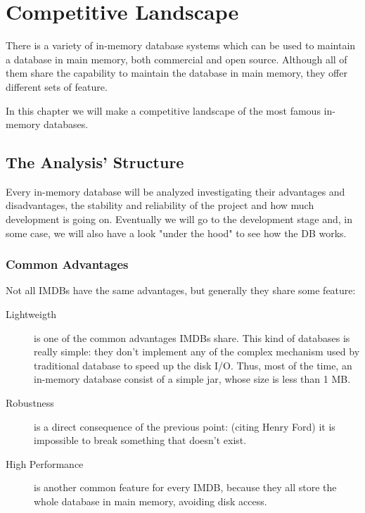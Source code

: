 \chapter{Competitive Landscape}
	There is a variety of in-memory database systems which can be used to maintain a 
	database in main memory, both commercial and open source. Although all of them share the capability 
	to maintain the database in main memory, they offer different sets of feature. 
	
	In this chapter we will make a competitive landscape of the most famous in-memory databases.
	
	\section{The Analysis' Structure}
	Every in-memory database will be analyzed investigating 
	their advantages and disadvantages, the stability and reliability of the project 
	and how much development is going on. Eventually we will go to the development stage and, 
	in some case, we will also have a look "under the hood" to see how the DB works.
	
	\subsection{Common Advantages}
	Not all IMDBs have the same advantages, but generally they share some feature:
	
	\begin{description}
		\item[Lightweigth] is one of the common advantages IMDBs share. This kind of databases is really simple: they 
		don't implement any of the complex mechanism used by traditional database to speed up the disk I/O. Thus, 
		most of the time, an in-memory database consist of a simple jar, whose size is less than 1 MB. 
		\item[Robustness] is a direct consequence of the previous point: (citing Henry Ford) it is impossible to 
		break something that doesn't exist.
		\item[High Performance] is another common feature for every IMDB, because they all store the whole database 
		in main memory, avoiding disk access.
	\end{description}
	
